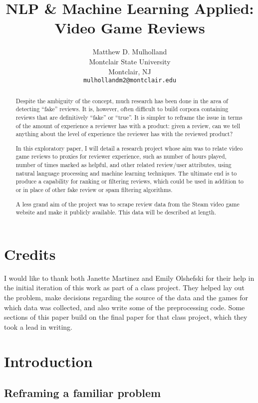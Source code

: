 \documentclass[9pt]{article}
\title{NLP \& Machine Learning Applied: Video Game Reviews}
\author{Matthew D. Mulholland \\
  Montclair State University \\
  Montclair, NJ \\
  {\tt mulhollandm2@montclair.edu}}
\date{}
\begin{document}
\maketitle
\begin{abstract}
Despite the ambiguity of the concept, much research has been done in the area of detecting ``fake'' reviews. It is, however, often difficult to build corpora containing reviews that are definitively ``fake'' or ``true''. It is simpler to reframe the issue in terms of the amount of experience a reviewer has with a product: given a review, can we tell anything about the level of experience the reviewer has with the reviewed product?

In this exploratory paper, I will detail a research project whose aim was to relate video game reviews to proxies for reviewer experience, such as number of hours played, number of times marked as helpful, and other related review/user attributes, using natural language processing and machine learning techniques. The ultimate end is to produce a capability for ranking or filtering reviews, which could be used in addition to or in place of other fake review or spam filtering algorithms.

A less grand aim of the project was to scrape review data from the Steam video game website and make it publicly available. This data will be described at length.
\end{abstract}

\section{Credits}
\label{sec:credits}

I would like to thank both Janette Martinez and Emily Olshefski for their help in the initial iteration of this work as part of a class project. They helped lay out the problem, make decisions regarding the source of the data and the games for which data was collected, and also write some of the preprocessing code. Some sections of this paper build on the final paper for that class project, which they took a lead in writing.

\section{Introduction}
\label{sec:intro}

\subsection{Reframing a familiar problem}
\label{ssec:reframing}
\end{document}

